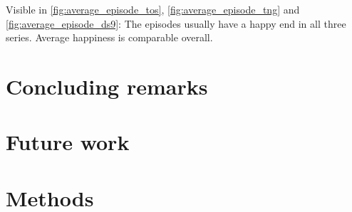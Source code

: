 Visible in \ref{fig:average_episode_tos}, \ref{fig:average_episode_tng} and \ref{fig:average_episode_ds9}: The episodes usually have a happy end in all three series. Average happiness is comparable overall.

\section{Concluding remarks}
\label{sec:startrek_dimensions.concludingremarks}


\section{Future work}
\label{sec:startrek_dimensions.futurework}

\section{Methods}
\label{sec:startrek_dimensions.methods}


